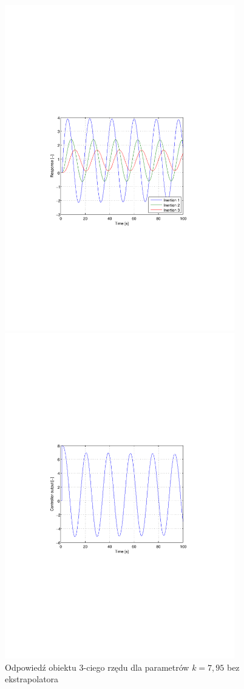 \documentclass[12pt]{article}
\begin{document}
\begin{figure}[!htb]
	\begin{center}
		\includegraphics[trim=5cm 9cm 5cm 9cm,width=10cm]{../res/img/d2_c_7,95y.pdf}
	\end{center}
	 
	\begin{center}
		\includegraphics[trim=5cm 9cm 5cm 9cm,width=10cm]{../res/img/d2_c_7,95u.pdf} 
	\end{center}
	\caption{Odpowiedź obiektu 3-ciego rzędu dla parametrów $k=7,95$ bez
	ekstrapolatora}
\end{figure}
\end{document}
